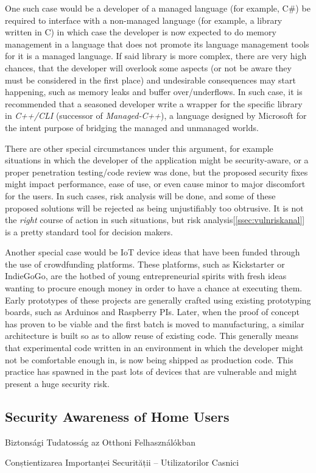 \documentclass[a4paper,12pt]{article}
\newcommand\subsectionhu[1]{\addcontentsline{toc.hu}{subsection} {\protect\numberline{\thesubsection} #1}}
\newcommand\subsectionro[1]{\addcontentsline{toc.ro}{subsection} {\protect\numberline{\thesubsection} #1}}
\begin{document}
	One such case would be a developer of a managed language (for example, C\#) be required to interface with a non-managed language (for example, a library written in C) in which case the developer is now expected to do memory management in a language that does not promote its language management tools for it is a managed language. If said library is more complex, there are very high chances, that the developer will overlook some aspects (or not be aware they must be considered in the first place) and undesirable consequences may start happening, such as memory leaks and buffer over/underflows. In such case, it is recommended that a seasoned developer write a wrapper for the specific library in \textit{C++/CLI} (successor of \textit{Managed-C++}), a language designed by Microsoft for the intent purpose\cite{hstutter06} of bridging the managed and unmanaged worlds.
	
	There are other special circumstances under this argument, for example situations in which the developer of the application might be security-aware, or a proper penetration testing/code review was done, but the proposed security fixes might impact performance, ease of use, or even cause minor to major discomfort for the users. In such cases, risk analysis will be done, and some of these proposed solutions will be rejected as being unjustifiably too obtrusive. It is not the \textit{right} course of action in such situations, but risk analysis[\ref{ssec:vulnriskanal}] is a pretty standard tool for decision makers.
	
	Another special case would be IoT device ideas that have been funded through the use of crowdfunding platforms. These platforms, such as Kickstarter or IndieGoGo, are the hotbed of young entrepreneurial spirits with fresh ideas wanting to procure enough money in order to have a chance at executing them. Early prototypes of these projects are generally crafted using existing prototyping boards, such as Arduinos and Raspberry PIs. Later, when the proof of concept has proven to be viable and the first batch is moved to manufacturing, a similar architecture is built so as to allow reuse of existing code. This generally means that experimental code written in an environment in which the developer might not be comfortable enough in, is now being shipped as production code. This practice has spawned in the past lots of devices that are vulnerable and might present a huge security risk.\cite{mstan14}
	
\subsection{Security Awareness of Home Users}
\subsectionhu{Biztonsági Tudatosság az Otthoni Felhasználókban} \subsectionro{Conștientizarea Importanței Securității -- Utilizatorilor Casnici}
	
\end{document}
